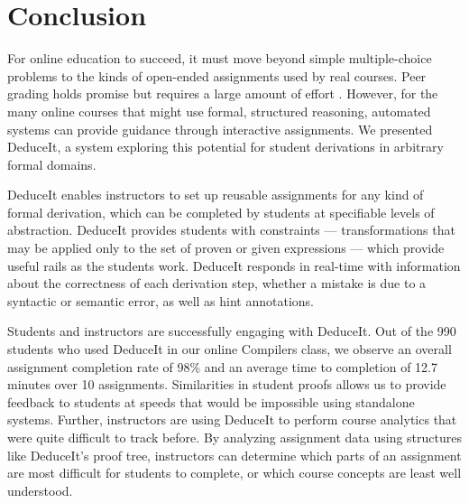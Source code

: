 \documentclass{sigchi}
\begin{document}






\section{Conclusion}

For online education to succeed, it must move beyond simple multiple-choice problems to the kinds of open-ended assignments used by real courses. Peer grading holds promise but requires a large amount of effort \cite{peer-consistency}. However, for the many online courses that might use formal, structured reasoning, automated systems can provide guidance through interactive assignments. We presented DeduceIt, a system exploring this potential for student derivations in arbitrary formal domains. 

DeduceIt enables instructors to set up reusable assignments for any kind of formal derivation, which can be completed by students at specifiable levels of abstraction. DeduceIt provides students with constraints --- transformations that may be applied only to the set of proven or given expressions --- which provide useful rails as the students work. DeduceIt responds in real-time with information about the correctness of each derivation step, whether a mistake is due to a syntactic or semantic error, as well as hint annotations.

Students and instructors are successfully engaging with DeduceIt. Out of the 990 students who used DeduceIt in our online Compilers class, we observe an overall assignment completion rate of 98\% and an average time to completion of 12.7 minutes over 10 assignments. Similarities in student proofs allows us to provide feedback to students at speeds that would be impossible using standalone systems. Further, instructors are using DeduceIt to perform course analytics that were quite difficult to track before. By analyzing assignment data using structures like DeduceIt's proof tree, instructors can determine which parts of an assignment are most difficult for students to complete, or which course concepts are least well understood.
\end{document}
